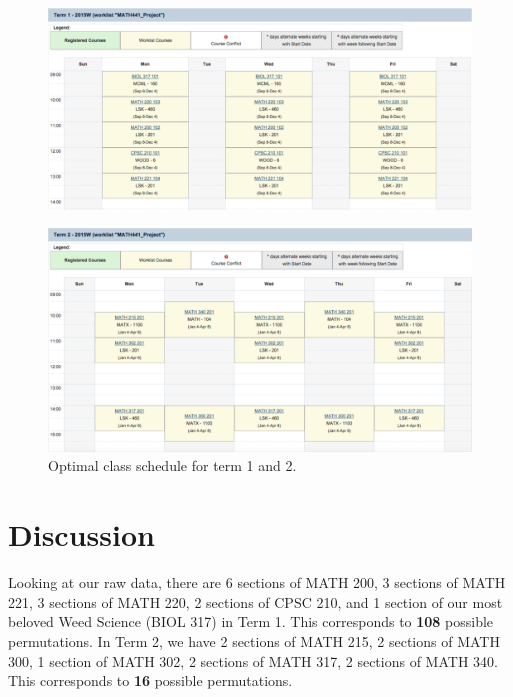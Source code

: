 \documentclass[11pt, oneside]{article}   	%
\begin{document}
\begin{figure}[h!]                                  
\begin{center}
\includegraphics[width=.99\textwidth]{term1.png}
\end{center}
\end{figure}

\begin{figure}[h!]    %
\begin{center}
\includegraphics[width=.99\textwidth]{term2.png}
\caption{\label{fig:term2}Optimal class schedule for term 1 and 2.}
\end{center}
\end{figure}



\cleardoublepage
\section{Discussion}


Looking at our raw data, there are 6 sections of MATH 200, 3 sections of MATH 221, 3 sections of MATH 220, 2 sections of CPSC 210, and 1 section of our most beloved Weed Science (BIOL 317) in Term 1. This corresponds to \textbf{108} possible permutations. In Term 2, we have 2 sections of MATH 215, 2 sections of MATH 300, 1 section of MATH 302, 2 sections of MATH 317, 2 sections of MATH 340. This corresponds to \textbf{16} possible permutations.
\end{document}
